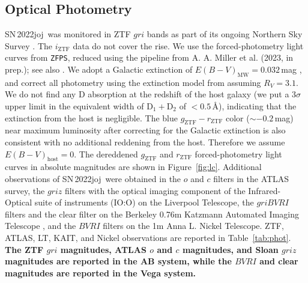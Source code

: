 \documentclass[twocolumn]{aastex631}
\newcommand{\sn}{SN\,2022joj}
\newcommand{\rev}[1]{\textbf{#1}}
\begin{document}
\begin{CJK*}{UTF8}{gbsn}


\subsection{Optical Photometry}
\sn\ was monitored in ZTF $gri$ bands as part of its ongoing Northern Sky Survey \citep{Bellm_ZTF_2019b}. The $i_\mathrm{ZTF}$ data do not cover the rise. We use the forced-photometry light curves from \texttt{ZFPS}, reduced using the pipeline from A. A. Miller et al. (2023, in prep.); see also \citet{Yao_2019}. We adopt a Galactic extinction of ${E(B-V)_\mathrm{MW}}=0.032$\,mag \citep{Schlafly2011}, and correct all photometry using the extinction model from \citet{Fitzpatrick1999} assuming $R_V=3.1$. We do not find any  D absorption at the redshift of the host galaxy (we put a 3$\sigma$ upper limit in the equivalent width of  $\mathrm{D_1}+\mathrm{D_2}$ of $<$$0.5$\,\r{A}), indicating that the extinction from the host is negligible. The blue $g_\mathrm{ZTF}-r_\mathrm{ZTF}$ color ($\sim$$-0.2$\,mag) near maximum luminosity after correcting for the Galactic extinction is also consistent with no additional reddening from the host. Therefore we assume ${E(B-V)}_\mathrm{host}=0$. The dereddened $g_\mathrm{ZTF}$ and $r_\mathrm{ZTF}$ forced-photometry light curves in absolute magnitudes are shown in Figure~\ref{fig:lc}. 
Additional observations of \sn\ were obtained in the $o$ and $c$ filters in the ATLAS survey, the $griz$ filters with the optical imaging component of the Infrared-Optical suite of instruments (IO:O) on the Liverpool Telescope, the $griBVRI$ filters and the clear filter on the Berkeley 0.76m Katzmann Automated Imaging Telescope \citep[KAIT;][]{KAIT_2001}, and the $BVRI$ filters on the 1m Anna L. Nickel Telescope. ZTF, ATLAS, LT, KAIT, and Nickel observations are reported in Table~\ref{tab:phot}. \rev{The ZTF $gri$ magnitudes, ATLAS $o$ and $c$ magnitudes, and Sloan $griz$ magnitudes are reported in the AB system, while the $BVRI$ and clear magnitudes are reported in the Vega system.}


\end{CJK*}
\end{document}
